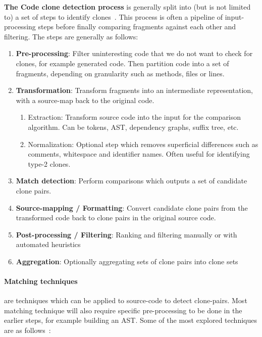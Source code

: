 \textbf{The Code clone detection process} is generally split into (but is not limited to)
a set of steps to identify clones~\cite{Inoue_introduction_to_cc}. This
process is often a pipeline of input-processing steps before finally comparing fragments
against each other and filtering. The steps are generally as follows:

\begin{enumerate}
	\item \textbf{Pre-processing}: Filter uninteresting code that we do not want to
	      check for clones, for example generated code. Then partition code into a set of
	      fragments, depending on granularity such as methods, files or lines.
	\item \textbf{Transformation}: Transform fragments into an intermediate
	      representation, with a source-map back to the original code.
	      \begin{enumerate}
		      \item Extraction: Transform source code into the input for the comparison
		            algorithm. Can be tokens, AST, dependency graphs, suffix tree, etc.
		      \item Normalization: Optional step which removes superficial differences such as
		            comments, whitespace and identifier names. Often useful for identifying type-2
		            clones.
	      \end{enumerate}
	\item \textbf{Match detection}: Perform comparisons which outputs a set of
	      candidate clone pairs.
	\item \textbf{Source-mapping / Formatting}: Convert candidate clone pairs from the transformed
	      code back to clone pairs in the original source code.
	\item \textbf{Post-processing / Filtering}: Ranking and filtering manually or with
	      automated heuristics
	\item \textbf{Aggregation}: Optionally aggregating sets of clone pairs into clone sets
\end{enumerate}

\paragraph{Matching techniques} are techniques which can be applied to source-code to
detect clone-pairs. Most matching technique will also require specific pre-processing to be
done in the earlier steps, for example building an AST. Some of the most explored
techniques are as follows~\cite{ComparisonAndEvaluationOfTechniques}:

